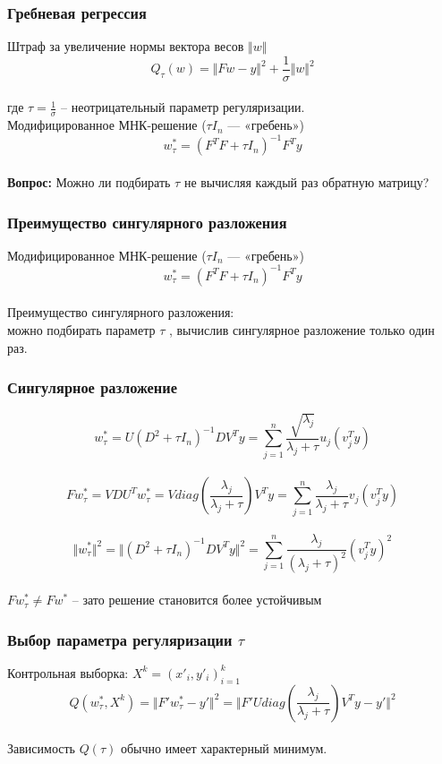\documentclass[12pt]{beamer}
\begin{document}
\begin{frame}\frametitle{Гребневая регрессия}
Штраф за увеличение нормы вектора весов $\Vert w \Vert$\\
$$Q_{\tau} (w) = \Vert F w - y \Vert^2 + \frac{1}{\sigma} \Vert w \Vert^2$$\\
где $\tau = \frac{1}{\sigma}$ -- неотрицательный параметр регуляризации.\\
\vspace{5mm}
Модифицированное МНК-решение ($\tau I_n$ — «гребень»)\\
$$w^*_{\tau} = (F^TF + \tau I_n)^{-1}F^Ty$$\\

\textbf{Вопрос:} Можно ли подбирать $\tau$ не вычисляя каждый раз обратную матрицу?
\end{frame}

\begin{frame}\frametitle{Преимущество сингулярного разложения}
Модифицированное МНК-решение ($\tau I_n$ — «гребень»)\\
$$w^*_{\tau} = (F^TF + \tau I_n)^{-1}F^Ty$$\\
Преимущество сингулярного разложения:\\
можно подбирать параметр $\tau$ , вычислив сингулярное разложение только один раз.
\end{frame}

\begin{frame}\frametitle{Сингулярное разложение}
$$w_{\tau}^*= U(D^2 + \tau I_n)^{-1}DV^Ty = \sum\limits_{j=1}^n \frac{\sqrt{\lambda_j}}{\lambda_j + \tau} u_j(v_j^Ty)$$\\
$$Fw_{\tau}^* = VDU^Tw_{\tau}^* = V diag \left(\frac{\lambda_j}{\lambda_j + \tau}\right) V^Ty = \sum\limits_{j=1}^n \frac{\lambda_j}{\lambda_j + \tau} v_j (v_j^Ty)$$\\
$$\Vert w_{\tau}^* \Vert^2 = \Vert (D^2 + \tau I_n)^{-1} DV^T y \Vert^2 = \sum\limits_{j=1}^n \frac{\lambda_j}{(\lambda_j + \tau)^2} (v^T_j y)^2$$\\
$F w_{\tau}^* \neq Fw^*$ -- зато решение становится более устойчивым
\end{frame}

\begin{frame}\frametitle{Выбор параметра регуляризации $\tau$}
Контрольная выборка: $X^k = (x'_i, y'_i)_{i=1}^k$\\
$$Q(w_{\tau}^*,X^k) = \Vert F' w_{\tau}^* - y' \Vert^2 = \Vert F'U diag \left(\frac{\lambda_j}{\lambda_j + \tau}\right) V^T y -y' \Vert^2$$\\
Зависимость $Q(\tau)$ обычно имеет характерный минимум.
\end{frame}
\end{document}
